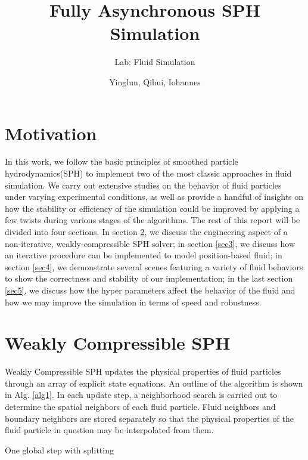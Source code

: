 \documentclass[
	11pt, 
	DIV10,
	ngerman,
	a4paper, 
	oneside, 
	headings=normal, 
	captions=tableheading,
	final, 
	numbers=noenddot
]{scrartcl}
\title{Fully Asynchronous SPH Simulation}
\subtitle{\vspace{0.5cm}Lab: Fluid Simulation}
\author{Yinglun, Qihui, Iohannes}
\begin{document}
\maketitle


\section{Motivation}

In this work, we follow the basic principles of smoothed particle hydrodynamics(SPH) to implement two of the most classic approaches in fluid simulation. We carry out extensive studies on the behavior of fluid particles under varying experimental conditions, as well as provide a handful of insights on how the stability or efficiency of the simulation could be improved by applying a few twists during various stages of the algorithms. The rest of this report will be divided into four sections. In section \ref{sec2}, we discuss the engineering aspect of a non-iterative, weakly-compressible SPH solver; in section \ref{sec3}, we discuss how an iterative procedure can be implemented to model position-based fluid; in section \ref{sec4}, we demonstrate several scenes featuring a variety of fluid behaviors to show the correctness and stability of our implementation; in the last section \ref{sec5}, we discuss how the hyper parameters affect the behavior of the fluid and how we may improve the simulation in terms of speed and robustness.


\section{Weakly Compressible SPH}
\label{sec2}

Weakly Compressible SPH updates the physical properties of fluid particles through an array of explicit state equations. An outline of the algorithm is shown in Alg. \ref{alg1}. In each update step, a neighborhood search is carried out to determine the spatial neighbors of each fluid particle. Fluid neighbors and boundary neighbors are stored separately so that the physical properties of the fluid particle in question may be interpolated from them.

\large
\begin{algorithm}
	\DontPrintSemicolon
	\SetAlgoLined
	\SetAlCapNameFnt{\large}
	\SetAlCapFnt{\large}
	\caption{\label{alg1} One global step with splitting \cite{reinhardt2017fully}}
\end{algorithm}
\normalsize



\end{document}

